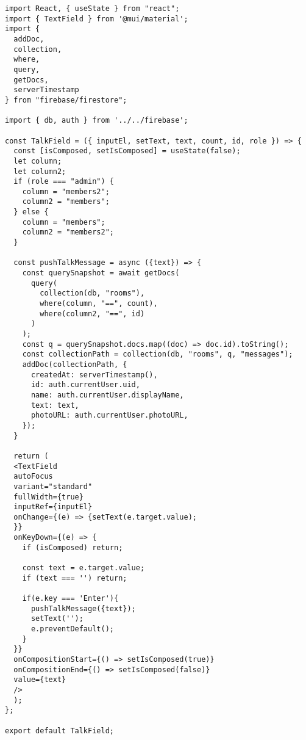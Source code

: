 \begin{verbatim}
import React, { useState } from "react";
import { TextField } from '@mui/material';
import {
  addDoc,
  collection,
  where,
  query,
  getDocs,
  serverTimestamp
} from "firebase/firestore";

import { db, auth } from '../../firebase';

const TalkField = ({ inputEl, setText, text, count, id, role }) => {
  const [isComposed, setIsComposed] = useState(false);
  let column;
  let column2;
  if (role === "admin") {
    column = "members2";
    column2 = "members";
  } else {
    column = "members";
    column2 = "members2";
  }

  const pushTalkMessage = async ({text}) => {
    const querySnapshot = await getDocs(
      query(
        collection(db, "rooms"),
        where(column, "==", count),
        where(column2, "==", id)
      )
    );
    const q = querySnapshot.docs.map((doc) => doc.id).toString();
    const collectionPath = collection(db, "rooms", q, "messages");
    addDoc(collectionPath, {
      createdAt: serverTimestamp(),
      id: auth.currentUser.uid,
      name: auth.currentUser.displayName,
      text: text,
      photoURL: auth.currentUser.photoURL,
    });
  }

  return (
  <TextField 
  autoFocus
  variant="standard"
  fullWidth={true} 
  inputRef={inputEl}
  onChange={(e) => {setText(e.target.value);
  }}
  onKeyDown={(e) => {
    if (isComposed) return;

    const text = e.target.value;
    if (text === '') return;

    if(e.key === 'Enter'){
      pushTalkMessage({text});
      setText('');
      e.preventDefault();
    }
  }}
  onCompositionStart={() => setIsComposed(true)}
  onCompositionEnd={() => setIsComposed(false)}
  value={text}
  />
  );
};

export default TalkField;
\end{verbatim}